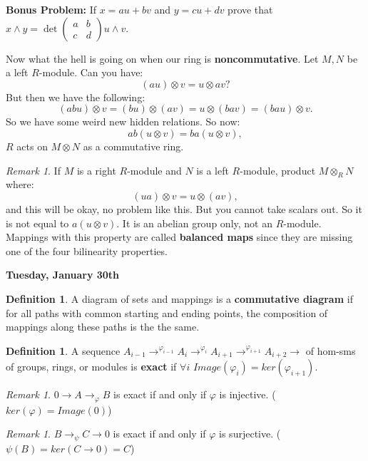 \documentclass[9pt,reqno,twoside]{amsbook}
\theoremstyle{plain}
\numberwithin{section}{chapter}
\numberwithin{equation}{chapter}
\theoremstyle{definition}
\newtheorem{Def}[theorem]{Definition}
\theoremstyle{remark}
\newtheorem{rem}[theorem]{Remark}
\theoremstyle{plain}
\newcommand{\tens}{\otimes}
\renewcommand{\phi}{\varphi}
\begin{document}
\textbf{Bonus Problem: } If $x= au + bv$ and $y = cu + dv$ prove that $x \wedge y = \det \left(\begin{matrix}
a & b\\
c & d
\end{matrix}\right) u \wedge v$. 

Now what the hell is going on when our ring is \textbf{noncommutative}. Let $M,N$ be a left $R$-module. Can you have: 
$$
(au) \tens v = u \tens av?
$$
But then we have the following:
$$
(abu) \tens v = (bu) \tens (av) = u \tens (bav) = (bau) \tens v.
$$
So we have some weird new hidden relations. So now:
$$
ab(u \tens v) = ba (u \tens v),
$$
$R$ acts on $M \tens N$ as a commutative ring. 

\begin{rem}
If $M$ is a right $R$-module and $N$ is a left $R$-module, product $M \tens_R N$ where:
$$
(ua) \tens v = u \tens (av),
$$ and this will be okay, no problem like this. But you cannot take scalars out. So it is not equal to $a(u \tens v)$. It is an abelian group only, not an $R$-module. Mappings with this property are called \textbf{balanced maps} since they are missing one of the four bilinearity properties. 
\end{rem}

\textbf{Tuesday, January 30th}

\begin{Def}
A diagram of sets and mappings is a \textbf{commutative diagram} if for all paths with common starting and ending points, the composition of mappings along these paths is the the same. 
\end{Def}

\begin{Def}
A sequence $A_{i -1} \rightarrow^{\phi_{i - 1}} A_i\rightarrow^{\phi_{i}} A_{i + 1} \rightarrow^{\phi_{i + 1}} A_{i + 2} \rightarrow$ of hom-sms of groups, rings, or modules is \textbf{exact} if $\forall i$ $Image(\phi_i) = ker(\phi_{i  +1})$. 
\end{Def}

\begin{rem}\label{exact1}
$0 \to A \to_{\phi} B$ is exact if and only if $\phi$ is injective. ($ker(\phi) = Image(0)$)
\end{rem}

\begin{rem}\label{exact2}
$B \to_\psi C \to 0$ is exact if and only if $\phi$ is surjective. ($\psi(B) = ker(C \to 0) = C$)
\end{rem}
\end{document}
